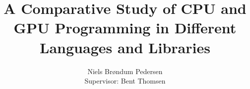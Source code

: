 \documentclass{llncs}
\begin{document}

\newpage

\title{A Comparative Study of CPU and GPU Programming in Different Languages and Libraries}

\author{Niels Br\o ndum Pedersen\\ Supervisor: Bent Thomsen}
\newpage







\end{document}
